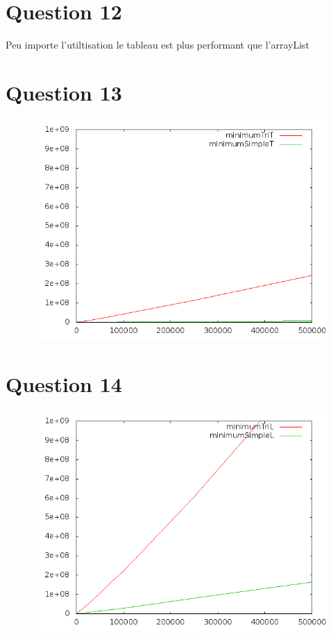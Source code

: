 \documentclass[a4paper,12pt]{report}
\begin{document}
\section*{Question 12}
Peu importe l'utiltisation le tableau est plus performant que l'arrayList


\newpage
\section*{Question 13}
\begin{figure}[!ht]
	\center
	\includegraphics[scale=0.4]{q13.png}
\end{figure}

\section*{Question 14}
\begin{figure}[!ht]
	\center
	\includegraphics[scale=0.4]{q14.png}
\end{figure}
\end{document}
